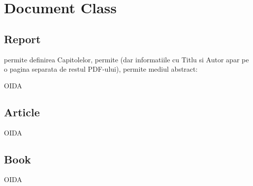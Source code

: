 \documentclass[11pt,a4paper]{article}
\begin{document}

\section{Document Class}
\subsection{Report}

permite definirea Capitolelor, permite \code{\maketitle}
(dar informatiile cu Titlu si Autor apar pe o pagina separata de restul PDF-ului),
permite mediul abstract:

OIDA

\subsection{Article}

OIDA

\subsection{Book}


OIDA
\end{document}
